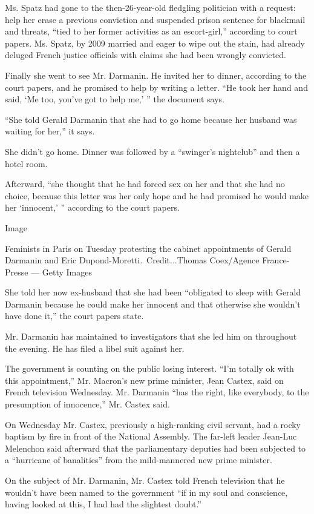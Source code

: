 Ms. Spatz had gone to the then-26-year-old fledgling politician with a
request: help her erase a previous conviction and suspended prison
sentence for blackmail and threats, ``tied to her former activities as
an escort-girl,'' according to court papers. Ms. Spatz, by 2009 married
and eager to wipe out the stain, had already deluged French justice
officials with claims she had been wrongly convicted.

Finally she went to see Mr. Darmanin. He invited her to dinner,
according to the court papers, and he promised to help by writing a
letter. ``He took her hand and said, `Me too, you've got to help me,' ''
the document says.

``She told Gerald Darmanin that she had to go home because her husband
was waiting for her,'' it says.

She didn't go home. Dinner was followed by a ``swinger's nightclub'' and
then a hotel room.

Afterward, ``she thought that he had forced sex on her and that she had
no choice, because this letter was her only hope and he had promised he
would make her `innocent,' '' according to the court papers.

Image

Feminists in Paris on Tuesday protesting the cabinet appointments of
Gerald Darmanin and Eric Dupond-Moretti.~Credit...Thomas Coex/Agence
France-Presse --- Getty Images

She told her now ex-husband that she had been ``obligated to sleep with
Gerald Darmanin because he could make her innocent and that otherwise
she wouldn't have done it,'' the court papers state.

Mr. Darmanin has maintained to investigators that she led him on
throughout the evening. He has filed a libel suit against her.

The government is counting on the public losing interest. ``I'm totally
ok with this appointment,'' Mr. Macron's new prime minister, Jean
Castex, said on French television Wednesday. Mr. Darmanin ``has the
right, like everybody, to the presumption of innocence,'' Mr. Castex
said.

On Wednesday Mr. Castex, previously a high-ranking civil servant, had a
rocky baptism by fire in front of the National Assembly. The far-left
leader Jean-Luc Melenchon said afterward that the parliamentary deputies
had been subjected to a ``hurricane of banalities'' from the
mild-mannered new prime minister.

On the subject of Mr. Darmanin, Mr. Castex told French television that
he wouldn't have been named to the government ``if in my soul and
conscience, having looked at this, I had had the slightest doubt.''


